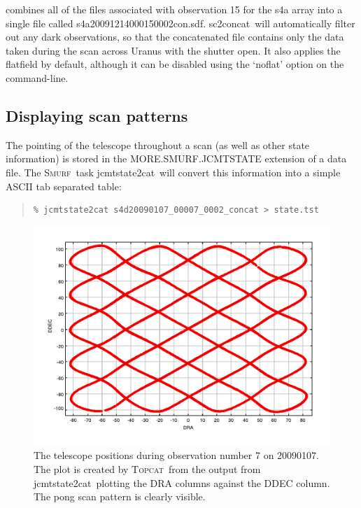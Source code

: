 \documentclass[twoside,11pt]{article}
\newenvironment{myquote}{\begin{quote}\begin{small}}{\end{small}\end{quote}}
\newcommand{\smurf}{\xref{\textsc{Smurf}}{sun258}{}}
\newcommand{\topcat}{\xref{\textsc{Topcat}}{sun253}{}}
\newcommand{\task}[1]{\textsf{#1}}
\newcommand{\concat}{\xref{\task{sc2concat}}{sun258}{SC2CONCAT}}
\newcommand{\jcmtstate}{\xref{\task{jcmtstate2cat}}{sun258}{JCMTSTATE2CAT}}
\newcommand{\xref}[3]{#1}
\newcommand{\xlabel}[1]{}
\renewcommand{\_}{\texttt{\symbol{95}}}
\begin{document}
combines all of the files associated with observation 15 for the s4a
array into a single file called
s4a20091214\_00015\_0002\_con.sdf. \concat\ will automatically filter
out any dark observations, so that the concatenated file contains only
the data taken during the scan across Uranus with the shutter open. It
also applies the flatfield by default, although it can be disabled using
the `noflat' option on the command-line.

\subsection{\xlabel{display_scan}Displaying scan patterns}

The pointing of the telescope throughout a scan (as well as other
state information) is stored in the MORE.SMURF.JCMTSTATE extension of
a data file. The \smurf\ task \jcmtstate\ will convert this
information into a simple ASCII tab separated table:

\begin{myquote}
\begin{verbatim}
% jcmtstate2cat s4d20090107_00007_0002_concat > state.tst
\end{verbatim}
\end{myquote}

\begin{figure}
\begin{center}
\includegraphics{sc19_scan_pattern}
\caption{The telescope positions during observation number 7 on
  20090107. The plot is created by \topcat\ from the output from
\jcmtstate\ plotting the DRA columns against the DDEC column. The pong
scan pattern is clearly visible.}
\label{fig:topcat}
\end{center}
\end{figure}
\end{document}
